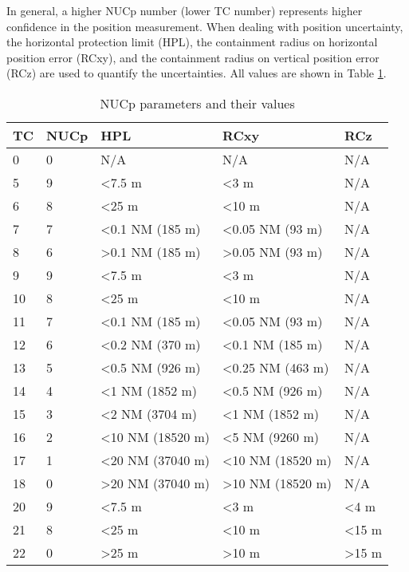 In general, a higher NUCp number (lower TC number) represents higher confidence in the position measurement. When dealing with position uncertainty, the horizontal protection limit (HPL), the containment radius on horizontal position error (RCxy), and the containment radius on vertical position error (RCz) are used to quantify the uncertainties. All values are shown in Table \ref{tb:nucp-params}.

\begin{table}[!ht]
\caption{NUCp parameters and their values}
\label{tb:nucp-params}
\begin{tabular}{|l|l|l|l|l|}
\hline
\textbf{TC} & \textbf{NUCp} & \textbf{HPL} & \textbf{RCxy} & \textbf{RCz} \\ \hline \hline
0 & 0 & N/A & N/A & N/A \\ \hline
5 & 9 & \textless 7.5 m & \textless 3 m & N/A \\ \hline
6 & 8 & \textless 25 m & \textless 10 m & N/A \\ \hline
7 & 7 & \textless 0.1 NM (185 m) & \textless 0.05 NM (93 m) & N/A \\ \hline
8 & 6 & \textgreater 0.1 NM (185 m) & \textgreater 0.05 NM (93 m) & N/A \\ \hline
\hline
9 & 9 & \textless 7.5 m & \textless 3 m & N/A \\ \hline
10 & 8 & \textless 25 m & \textless 10 m & N/A \\ \hline
11 & 7 & \textless 0.1 NM (185 m) & \textless 0.05 NM (93 m) & N/A \\ \hline
12 & 6 & \textless 0.2 NM (370 m) & \textless 0.1 NM (185 m) & N/A \\ \hline
13 & 5 & \textless 0.5 NM (926 m) & \textless 0.25 NM (463 m) & N/A \\ \hline
14 & 4 & \textless 1 NM (1852 m) & \textless 0.5 NM (926 m) & N/A \\ \hline
15 & 3 & \textless 2 NM (3704 m) & \textless 1 NM (1852 m) & N/A \\ \hline
16 & 2 & \textless 10 NM (18520 m) & \textless 5 NM (9260 m) & N/A \\ \hline
17 & 1 & \textless 20 NM (37040 m) & \textless 10 NM (18520 m) & N/A \\ \hline
18 & 0 & \textgreater 20 NM (37040 m) & \textgreater 10 NM (18520 m) & N/A \\ \hline
\hline
20 & 9 & \textless 7.5 m & \textless 3 m & \textless 4 m \\ \hline
21 & 8 & \textless 25 m & \textless 10 m & \textless 15 m \\ \hline
22 & 0 & \textgreater 25 m & \textgreater 10 m & \textgreater 15 m \\ \hline
\end{tabular}
\end{table}

